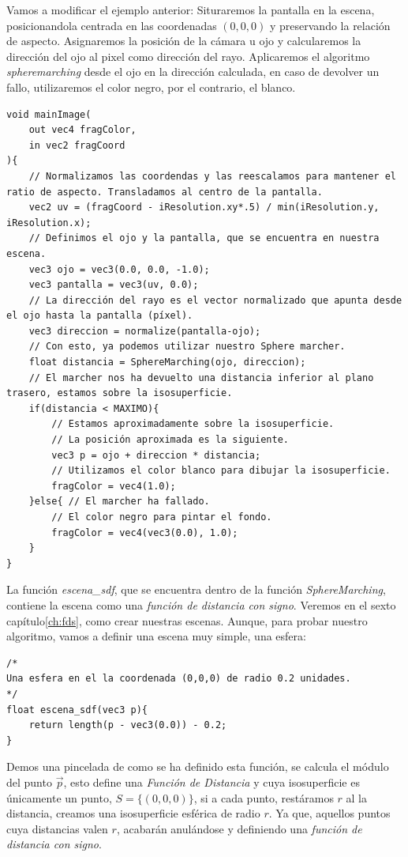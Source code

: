 Vamos a modificar el ejemplo anterior: Situraremos la pantalla en la escena, posicionandola centrada en las coordenadas \((0,0,0)\) y preservando la relación de aspecto.  Asignaremos la posición de la cámara u ojo y calcularemos la dirección del ojo al pixel como dirección del rayo. Aplicaremos el algoritmo \textit{spheremarching} desde el ojo en la dirección calculada, en caso de devolver un fallo, utilizaremos el color negro, por el contrario, el blanco.
\newpage
\begin{lstlisting}
void mainImage(
    out vec4 fragColor, 
    in vec2 fragCoord
){
    // Normalizamos las coordendas y las reescalamos para mantener el ratio de aspecto. Transladamos al centro de la pantalla.
    vec2 uv = (fragCoord - iResolution.xy*.5) / min(iResolution.y, iResolution.x);
    // Definimos el ojo y la pantalla, que se encuentra en nuestra escena.
    vec3 ojo = vec3(0.0, 0.0, -1.0);
    vec3 pantalla = vec3(uv, 0.0);
    // La dirección del rayo es el vector normalizado que apunta desde el ojo hasta la pantalla (píxel).
    vec3 direccion = normalize(pantalla-ojo);
    // Con esto, ya podemos utilizar nuestro Sphere marcher.
    float distancia = SphereMarching(ojo, direccion);
    // El marcher nos ha devuelto una distancia inferior al plano trasero, estamos sobre la isosuperficie.
    if(distancia < MAXIMO){
        // Estamos aproximadamente sobre la isosuperficie.
        // La posición aproximada es la siguiente.
        vec3 p = ojo + direccion * distancia;
        // Utilizamos el color blanco para dibujar la isosuperficie.
        fragColor = vec4(1.0);
    }else{ // El marcher ha fallado.
        // El color negro para pintar el fondo.
        fragColor = vec4(vec3(0.0), 1.0);
    }
}
\end{lstlisting}
\newpage
La función \textit{escena\_sdf}, que se encuentra dentro de la función \textit{SphereMarching}, contiene la escena como una \textit{función de distancia con signo}. Veremos en el sexto capítulo\ref{ch:fds}, como crear nuestras escenas. Aunque, para probar nuestro algoritmo, vamos a definir una escena muy simple, una esfera:
\begin{lstlisting}
/* 
Una esfera en el la coordenada (0,0,0) de radio 0.2 unidades.
*/
float escena_sdf(vec3 p){
    return length(p - vec3(0.0)) - 0.2;
}
\end{lstlisting}
Demos una pincelada de como se ha definido esta función, se calcula el módulo del punto \(\Vec{p}\), esto define una \textit{Función de Distancia} y cuya isosuperficie es únicamente un punto, \(S=\{(0,0,0)\}\), si a cada punto, restáramos \(r\) al la distancia, creamos una isosuperficie esférica de radio \(r\). Ya que, aquellos puntos cuya distancias valen \(r\), acabarán anulándose y definiendo una \textit{función de distancia con signo}.
